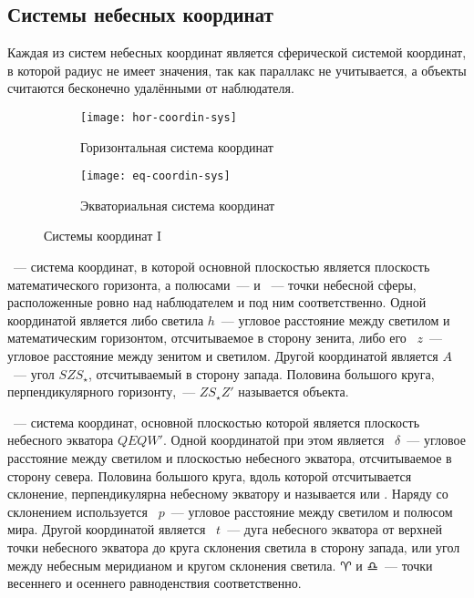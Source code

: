 \subsection{Системы небесных координат}
Каждая из систем небесных координат является сферической системой координат, в которой радиус не имеет значения, так как параллакс не учитывается, а объекты считаются бесконечно удалёнными от наблюдателя.

\begin{figure}[!h]
	\centering
	\begin{subfigure}{0.49\textwidth}
		\texttt{[image: hor-coordin-sys]}
		\caption{Горизонтальная система координат}
	\end{subfigure}
	\hfill
	\begin{subfigure}{0.49\textwidth}
		\texttt{[image: eq-coordin-sys]}
		\caption{Экваториальная система координат}
	\end{subfigure}
	\caption{Системы координат I}
\end{figure}
~--- система координат, в которой основной плоскостью является плоскость математического горизонта, а полюсами~---  и ~--- точки небесной сферы, расположенные ровно над наблюдателем и под ним соответственно. Одной координатой является либо  светила $h$~--- угловое расстояние между светилом и математическим горизонтом, отсчитываемое в сторону зенита, либо его ~$z$~--- угловое расстояние между зенитом и светилом. Другой координатой является  $A$~--- угол $SZS_\star$, отсчитываемый в сторону запада. Половина большого круга, перпендикулярного горизонту,~--- $Z S_\star Z'$  называется  объекта.

~--- система координат,
основной плоскостью которой является плоскость небесного экватора $QEQW'$.
Одной координатой при этом является ~$\delta$~--- угловое
расстояние между светилом и плоскостью небесного экватора, отсчитываемое в
сторону севера. Половина большого круга, вдоль которой отсчитывается склонение,
перпендикулярна небесному экватору и называется  или
. Наряду со склонением
используется ~$p$~--- угловое расстояние между
светилом и полюсом мира. Другой координатой является ~$t$~---
дуга небесного экватора от верхней точки небесного экватора до круга склонения
светила в сторону запада, или угол между небесным меридианом и кругом склонения
светила. $\aries$ и $\libra$~--- точки весеннего и осеннего равноденствия соответственно.

